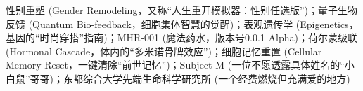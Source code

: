
\begin{keywords}
性别重塑 (Gender Remodeling，又称“人生重开模拟器：性别任选版”)；量子生物反馈 (Quantum Bio-feedback，细胞集体智慧的觉醒)；表观遗传学 (Epigenetics，基因的“时尚穿搭”指南)；MHR-001 (魔法药水，版本号0.0.1 Alpha)；荷尔蒙级联 (Hormonal Cascade，体内的“多米诺骨牌效应”)；细胞记忆重置 (Cellular Memory Reset，一键清除“前世记忆”)；Subject M (一位不愿透露具体姓名的“小白鼠”哥哥)；东都综合大学先端生命科学研究所 (一个经费燃烧但充满爱的地方)
\end{keywords}